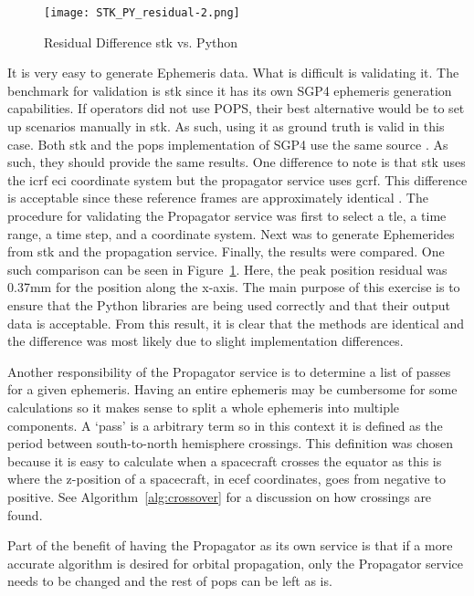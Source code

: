 \begin{figure}[h]
    \centering
    \texttt{[image: STK\_PY\_residual-2.png]} 
    \caption{Residual Difference \gls{stk} vs. Python}
    \label{fig:stk_py} 
\end{figure}

It is very easy to generate Ephemeris data. What is difficult is validating it.
The benchmark for validation is \gls{stk} since it has its own SGP4 ephemeris
generation capabilities. If operators did not use POPS, their best alternative
would be to set up scenarios manually in \gls{stk}. As such, using it as ground
truth is valid in this case. Both \gls{stk} \cite{kelso_celestrak_2022} and the
\gls{pops} implementation of SGP4 use the same source
\cite{vallado_revisiting_2006}.  As such, they should provide the same results.
One difference to note is that \gls{stk} uses the \gls{icrf} \gls{eci}
coordinate system but the propagator service uses \gls{gcrf}.  This difference
is acceptable since these reference frames are approximately identical
\cite{kaplan_iau_2006}.  The procedure for validating the Propagator service
was first to select a \gls{tle}, a time range, a time step, and a coordinate
system.  Next was to generate Ephemerides from \gls{stk} and the propagation
service.  Finally, the results were compared. One such comparison can be seen
in Figure~\ref{fig:stk_py}. Here, the peak position residual was 0.37mm for the
position along the x-axis. The main purpose of this exercise is to ensure that
the Python libraries are being used correctly and that their output data is
acceptable.  From this result, it is clear that the methods are identical and
the difference was most likely due to slight implementation differences. 

Another responsibility of the Propagator service is to determine a list of
passes for a given ephemeris. Having an entire ephemeris may be cumbersome for
some calculations so it makes sense to split a whole ephemeris into multiple
components. A `pass' is a arbitrary term so in this context it is defined as
the period between south-to-north hemisphere crossings. This definition was
chosen because it is easy to calculate when a spacecraft crosses the equator as
this is where the z-position of a spacecraft, in \gls{ecef} coordinates, goes
from negative to positive.  See Algorithm~\ref{alg:crossover} for a discussion
on how crossings are found.

Part of the benefit of having the Propagator as its own service is that if a
more accurate algorithm is desired for orbital propagation, only the Propagator
service needs to be changed and the rest of \gls{pops} can be left as is.


